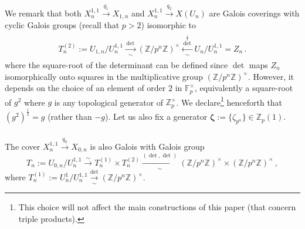 \documentclass{amsart}
\numberwithin{equation}{section}
\newcommand{\Zp}{\mathbb{Z}_p}
\newcommand{\ZZ}{\mathbb{Z}}
\newcommand{\FF}{\mathbb{F}}
\newcommand{\Z}{\ZZ}
\begin{document}
We remark that both $X^{1,1}_n\xrightarrow{\,q_1\,} X_{1,n}$ and $X^{1,1}_n\xrightarrow{\,q_2\,} X(U_n)$ are Galois coverings with cyclic Galois groups (recall that $p>2$) isomorphic to 
\begin{align}
    \label{eqn_2025_05_15_0823}
    \begin{aligned}
    T_n^{(2)}:=U_{1,n}/U^{1,1}_n\xrightarrow[\sim]{\,\det\,} (\ZZ/p^n\ZZ)^\times\xleftarrow[\sim]{\,\det^{\frac{1}{2}}\,} U_{n}/U^{1,1}_n=Z_n\,.
    \end{aligned}
\end{align}
where the square-root of the determinant can be defined since $\det$ maps $Z_n$ isomorphically onto squares in the multiplicative group $(\Z/p^n\Z)^\times$. However, it depends on the choice of an element of order $2$ in $\FF_p^\times$, equivalently a square-root of $g^2$ where $g$ is any topological generator of $\ZZ_p^\times$. We declare\footnote{This choice will not affect the main constructions of this paper (that concern triple products).} henceforth that $(g^2)^{\frac{1}{2}}=g$ (rather than $-g$). Let us also fix a generator $\pmb{\zeta}:=\{\zeta_{p^n}\}\in \Zp(1)$.

\subsubsection{} 
\label{subsubsec_B111_2025_07_01}
The cover $X^{1,1}_n\xrightarrow{\,q_0\,} X_{0,n}$ is also Galois with Galois group
$$T_n:=U_{0,n}/U^{1,1}_n \xrightarrow{\sim} T_n^{(1)}\times T_n^{(2)} \xrightarrow[\sim]{(\det,\det)} (\ZZ/p^n\ZZ)^\times \times (\ZZ/p^n\ZZ)^\times\,,$$
where $T_n^{(1)}:=U_{n}^1/U_{n}^{1,1}\xrightarrow[\sim]{\det}(\ZZ/p^n\ZZ)^\times$.
\end{document}
